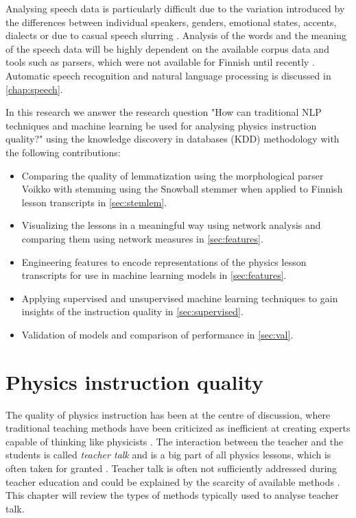 \documentclass[utf8,english]{gradu3}
\begin{document}
Analysing speech data is particularly difficult due to the variation introduced by the differences between individual speakers, genders, emotional states, accents, dialects or due to casual speech slurring \parencite{benzeghibaAutomaticSpeechRecognition2007}. Analysis of the words and the meaning of the speech data will be highly dependent on the available corpus data and tools such as parsers, which were not available for Finnish until recently \parencite{haverinenNaturalLanguageProcessing2014, enarviModelingConversationalFinnish2018}. Automatic speech recognition and natural language processing is discussed in \autoref{chap:speech}.

In this research we answer the research question "How can traditional NLP techniques and machine learning be used for analysing physics instruction quality?" using the knowledge discovery in databases (KDD) methodology with the following contributions:

\begin{itemize}
  \item Comparing the quality of lemmatization using the morphological parser Voikko with stemming using the Snowball stemmer when applied to Finnish lesson transcripts in \autoref{sec:stemlem}.
  \item Visualizing the lessons in a meaningful way using network analysis and comparing them using network measures in \autoref{sec:features}.
  \item Engineering features to encode representations of the physics lesson transcripts for use in machine learning models in \autoref{sec:features}. 
  \item Applying supervised and unsupervised machine learning techniques to gain insights of the instruction quality in \autoref{sec:supervised}.
  \item Validation of models and comparison of performance in \autoref{sec:val}.
\end{itemize}

\chapter{Physics instruction quality}
\label{chap:quip}

The quality of physics instruction has been at the centre of discussion, where traditional teaching methods have been criticized as inefficient at creating experts capable of thinking like physicists \parencite{wiemanTransformingPhysicsEducation2007}. The interaction between the teacher and the students is called \emph{teacher talk} and is a big part of all physics lessons, which is often taken for granted \parencite{scottTeachingScienceMeaningful2007}. Teacher talk is often not sufficiently addressed during teacher education and could be explained by the scarcity of available methods \parencite{lehesvuoriDialogicTeachingScience2013,viiriTeacherTalkPatterns2006, crespoPraisingCorrectingProspective2002}. This chapter will review the types of methods typically used to analyse teacher talk.
\end{document}
